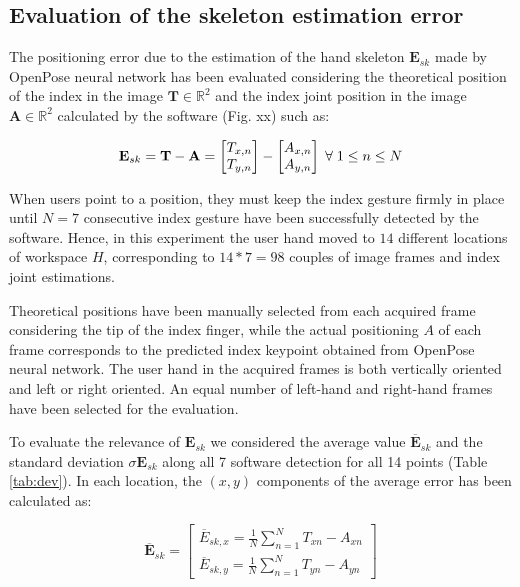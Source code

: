 \documentclass[a4paper, 10 pt, conference]{ieeeconf}      %
\begin{document}
\subsection{Evaluation of the skeleton estimation error}

The positioning error due to the estimation of the hand skeleton $\mathbf{E}_{sk}$ made by OpenPose neural network has been evaluated considering the theoretical position of the index in the image $\mathbf{T} \in \mathbb{R}^2$ and the index joint position in the image $\mathbf{A} \in \mathbb{R}^2$ calculated by the software (Fig. xx) such as:

\begin{equation}
\mathbf{E}_{sk} = \mathbf{T} - \mathbf{A} = \begin{bmatrix}
T_{x,n}\\
T_{y,n}
\end{bmatrix}-
\begin{bmatrix}
A_{x,n}\\
A_{y,n}
\end{bmatrix}
\thickspace
\forall \thickspace 1 \leq n \leq N
\end{equation}

When users point to a position, they must keep the index gesture firmly in place until $N = 7$ consecutive index gesture have been successfully detected by the software. Hence, in this experiment the user hand moved to $14$ different locations of workspace $H$, corresponding to $14 * 7 = 98$ couples of image frames and index joint estimations.

Theoretical positions have been manually selected from each acquired frame considering the tip of the index finger, while the actual positioning $A$ of each frame corresponds to the predicted index keypoint obtained from OpenPose neural network. The user hand in the acquired frames is both vertically oriented and left or right oriented. An equal number of left-hand and right-hand frames have been selected for the evaluation.

To evaluate the relevance of $\mathbf{E}_{sk}$ we considered the average value $\overline{\mathbf{E}}_{sk}$ and the standard deviation $\sigma{\mathbf{E}}_{sk}$ along all 7 software detection for all 14 points (Table \ref{tab:dev}). In each location, the $(x,y)$ components of the average error has been calculated as:

\begin{equation}
\overline{\mathbf{E}}_{sk} = \begin{bmatrix}
\overline{E}_{sk,x}  = \frac{1}{N}\sum_{n=1}^{N} T_{xn} - A_{xn} \\
\overline{E}_{sk,y} = \frac{1}{N}\sum_{n=1}^{N} T_{yn} - A_{yn}
\end{bmatrix}
\end{equation}
\end{document}
